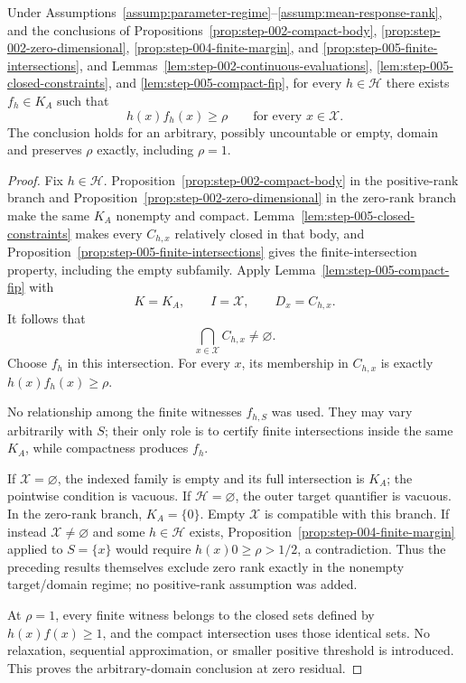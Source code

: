 \begin{proposition}
\label{prop:step-005-global-margin}
Under Assumptions~\ref{assump:parameter-regime}--\ref{assump:mean-response-rank},
and the conclusions of Propositions~\ref{prop:step-002-compact-body},
\ref{prop:step-002-zero-dimensional},
\ref{prop:step-004-finite-margin}, and
\ref{prop:step-005-finite-intersections}, and
Lemmas~\ref{lem:step-002-continuous-evaluations},
\ref{lem:step-005-closed-constraints}, and
\ref{lem:step-005-compact-fip}, for every \(h\in\mathcal H\) there exists
\(f_h\in K_A\) such that
\[
h(x)f_h(x)\ge\rho
\qquad\text{for every }x\in\mathcal X.
\]
The conclusion holds for an arbitrary, possibly uncountable or empty, domain
and preserves \(\rho\) exactly, including \(\rho=1\).
\end{proposition}

\begin{proof}
Fix \(h\in\mathcal H\).  Proposition~\ref{prop:step-002-compact-body} in the
positive-rank branch and Proposition~\ref{prop:step-002-zero-dimensional} in
the zero-rank branch make the same \(K_A\) nonempty and compact.
Lemma~\ref{lem:step-005-closed-constraints} makes every \(C_{h,x}\) relatively
closed in that body, and
Proposition~\ref{prop:step-005-finite-intersections} gives the
finite-intersection property, including the empty subfamily.  Apply
Lemma~\ref{lem:step-005-compact-fip} with
\[
K=K_A,\qquad I=\mathcal X,\qquad D_x=C_{h,x}.
\]
It follows that
\[
\bigcap_{x\in\mathcal X}C_{h,x}\ne\varnothing.
\]
Choose \(f_h\) in this intersection.  For every \(x\), its membership in
\(C_{h,x}\) is exactly \(h(x)f_h(x)\ge\rho\).

No relationship among the finite witnesses \(f_{h,S}\) was used.  They may
vary arbitrarily with \(S\); their only role is to certify finite
intersections inside the same \(K_A\), while compactness produces \(f_h\).

If \(\mathcal X=\varnothing\), the indexed family is empty and its full
intersection is \(K_A\); the pointwise condition is vacuous.  If
\(\mathcal H=\varnothing\), the outer target quantifier is vacuous.  In the
zero-rank branch, \(K_A=\{0\}\).  Empty \(\mathcal X\) is compatible with
this branch.  If instead \(\mathcal X\ne\varnothing\) and some
\(h\in\mathcal H\) exists, Proposition~\ref{prop:step-004-finite-margin}
applied to \(S=\{x\}\) would require \(h(x)0\ge\rho>1/2\), a contradiction.
Thus the preceding results themselves exclude zero rank exactly in the
nonempty target/domain regime; no positive-rank assumption was added.

At \(\rho=1\), every finite witness belongs to the closed sets defined by
\(h(x)f(x)\ge1\), and the compact intersection uses those identical sets.
No relaxation, sequential approximation, or smaller positive threshold is
introduced.  This proves the arbitrary-domain conclusion at zero residual.
\end{proof}

